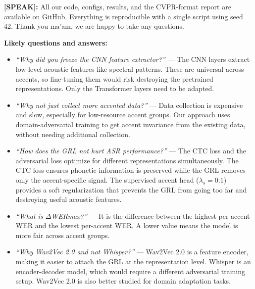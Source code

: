 \documentclass[12pt,a4paper]{article}
\newcommand{\say}[1]{%
  \begin{speakbox}
  \textbf{\color{speakblue}[SPEAK]:} #1
  \end{speakbox}
  \vspace{4pt}
}
\begin{document}
\say{All our code, configs, results, and the CVPR-format report are available on GitHub.
Everything is reproducible with a single script using seed 42. Thank you ma'am, we are
happy to take any questions.}

\vspace{8pt}
\begin{notebox}
\textbf{Likely questions and answers:}
\begin{itemize}[leftmargin=1.5em]
  \item \textit{``Why did you freeze the CNN feature extractor?''} --- The CNN layers
  extract low-level acoustic features like spectral patterns. These are universal across
  accents, so fine-tuning them would risk destroying the pretrained representations.
  Only the Transformer layers need to be adapted.

  \item \textit{``Why not just collect more accented data?''} --- Data collection is
  expensive and slow, especially for low-resource accent groups. Our approach uses
  domain-adversarial training to get accent invariance from the existing data, without
  needing additional collection.

  \item \textit{``How does the GRL not hurt ASR performance?''} --- The CTC loss and
  the adversarial loss optimize for different representations simultaneously. The CTC
  loss ensures phonetic information is preserved while the GRL removes only the
  accent-specific signal. The supervised accent head ($\lambda_s = 0.1$) provides
  a soft regularization that prevents the GRL from going too far and destroying
  useful acoustic features.

  \item \textit{``What is $\Delta$WERmax?''} --- It is the difference between the
  highest per-accent WER and the lowest per-accent WER. A lower value means the
  model is more fair across accent groups.

  \item \textit{``Why Wav2Vec 2.0 and not Whisper?''} --- Wav2Vec 2.0 is a
  feature encoder, making it easier to attach the GRL at the representation level.
  Whisper is an encoder-decoder model, which would require a different adversarial
  training setup. Wav2Vec 2.0 is also better studied for domain adaptation tasks.
\end{itemize}
\end{notebox}
\end{document}
